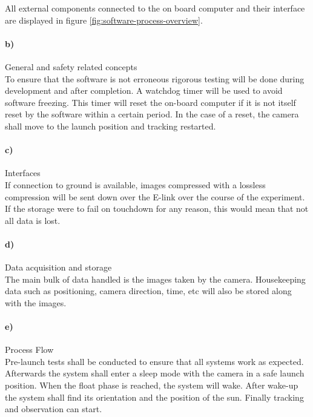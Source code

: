 All external components connected to the on board computer and their interface are displayed in figure \ref{fig:software-process-overview}. 

\paragraph{b)} General and safety related concepts\\

To ensure that the software is not erroneous rigorous testing will be done during development and after completion. A watchdog timer will be used to avoid software freezing. This timer will reset the on-board computer if it is not itself reset by the software within a certain period. In the case of a reset, the camera shall move to the launch position and tracking restarted.

\paragraph{c)} Interfaces\\

If connection to ground is available, images compressed with a lossless compression will be sent down over the E-link over the course of the experiment. If the storage were to fail on touchdown for any reason, this would mean that not all data is lost.





\paragraph{d)} Data acquisition and storage\\

The main bulk of data handled is the images taken by the camera. Housekeeping data such as positioning, camera direction, time, etc will also be stored along with the images.


\paragraph{e)} Process Flow\\

Pre-launch tests shall be conducted to ensure that all systems work as expected. Afterwards the system shall enter a sleep mode with the camera in a safe launch position. When the float phase is reached, the system will wake. After wake-up the system shall find its orientation and the position of the sun. Finally tracking and observation can start.

